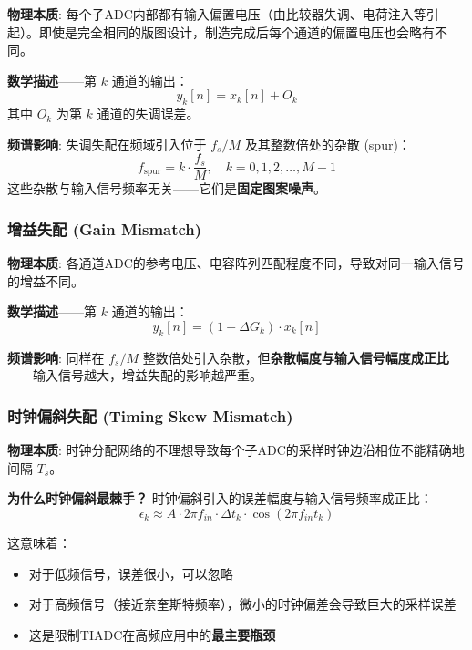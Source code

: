 \documentclass[UTF8,a4paper,11pt]{ctexart}
\begin{document}
\textbf{物理本质}: 每个子ADC内部都有输入偏置电压（由比较器失调、电荷注入等引起）。即使是完全相同的版图设计，制造完成后每个通道的偏置电压也会略有不同。

\textbf{数学描述}——第 $k$ 通道的输出：
\begin{equation}
    y_k[n] = x_k[n] + O_k
\end{equation}
其中 $O_k$ 为第 $k$ 通道的失调误差。

\textbf{频谱影响}: 失调失配在频域引入位于 $f_s/M$ 及其整数倍处的杂散 (spur)：
\begin{equation}
    f_{\text{spur}} = k \cdot \frac{f_s}{M}, \quad k = 0, 1, 2, \ldots, M-1
\end{equation}
这些杂散与输入信号频率无关——它们是\textbf{固定图案噪声}。

\subsubsection{增益失配 (Gain Mismatch)}

\textbf{物理本质}: 各通道ADC的参考电压、电容阵列匹配程度不同，导致对同一输入信号的增益不同。

\textbf{数学描述}——第 $k$ 通道的输出：
\begin{equation}
    y_k[n] = (1 + \Delta G_k) \cdot x_k[n]
\end{equation}

\textbf{频谱影响}: 同样在 $f_s/M$ 整数倍处引入杂散，但\textbf{杂散幅度与输入信号幅度成正比}——输入信号越大，增益失配的影响越严重。

\subsubsection{时钟偏斜失配 (Timing Skew Mismatch)}

\textbf{物理本质}: 时钟分配网络的不理想导致每个子ADC的采样时钟边沿相位不能精确地间隔 $T_s$。

\textbf{为什么时钟偏斜最棘手？} 时钟偏斜引入的误差幅度与输入信号频率成正比：
\begin{equation}
    \epsilon_k \approx A \cdot 2\pi f_{in} \cdot \Delta t_k \cdot \cos(2\pi f_{in} t_k)
\end{equation}

这意味着：
\begin{itemize}
    \item 对于低频信号，误差很小，可以忽略
    \item 对于高频信号（接近奈奎斯特频率），微小的时钟偏差会导致巨大的采样误差
    \item 这是限制TIADC在高频应用中的\textbf{最主要瓶颈}
\end{itemize}
\end{document}
